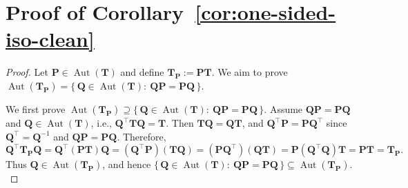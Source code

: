 \documentclass[onecolumn]{IEEEtran} %
\newcommand{\1}{\mathbbm{1}}
\DeclareMathOperator{\Aut}{Aut}
\theoremstyle{boldremark}
\begin{document}
\section{Proof of Corollary~\ref{cor:one-sided-iso-clean}}
\label{APP_proof_cor:one-sided-iso-clean}

\begin{proof}
Let $\mathbf P\in\Aut(\mathbf T)$ and define $\mathbf T_{\mathbf P}:=\mathbf P\mathbf T$.
We aim to prove $\Aut(\mathbf T_{\mathbf P})
=\bigl\{\,\mathbf Q\in\Aut(\mathbf T):\ \mathbf Q\mathbf P=\mathbf P\mathbf Q\,\bigr\}.$

We first prove
\(
\Aut(\mathbf{T}_{\mathbf{P}})
\supseteq
\bigl\{\,\mathbf{Q}\in\Aut(\mathbf{T}):\ \mathbf{Q}\mathbf{P}
  = \mathbf{P}\mathbf{Q}\,\bigr\}.
\)
Assume \(\mathbf{Q}\mathbf{P}=\mathbf{P}\mathbf{Q}\) and \(\mathbf{Q}\in\Aut(\mathbf{T})\), i.e.,
\(\mathbf{Q}^{\top}\mathbf{T}\mathbf{Q}=\mathbf{T}\).
Then \(\mathbf{T}\mathbf{Q}=\mathbf{Q}\mathbf{T}\), and
\(\mathbf{Q}^{\top}\mathbf{P}=\mathbf{P}\mathbf{Q}^{\top}\) since
\(\mathbf{Q}^{\top}=\mathbf{Q}^{-1}\) and \(\mathbf Q\mathbf P=\mathbf P\mathbf Q\).
Therefore,
\[
  \mathbf{Q}^{\top}\mathbf{T}_{\mathbf{P}}\mathbf{Q}
  = \mathbf{Q}^{\top}(\mathbf{P}\mathbf{T})\mathbf{Q}
  = (\mathbf{Q}^{\top}\mathbf{P})(\mathbf{T}\mathbf{Q})
  = (\mathbf{P}\mathbf{Q}^{\top})(\mathbf{Q}\mathbf{T})
  = \mathbf{P}(\mathbf{Q}^{\top}\mathbf{Q})\mathbf{T}
  = \mathbf{P}\mathbf{T}
  = \mathbf{T}_{\mathbf{P}}.
\]
Thus \(\mathbf{Q}\in\Aut(\mathbf{T}_{\mathbf{P}})\), and hence
$\bigl\{\,\mathbf{Q}\in\Aut(\mathbf{T}):\ \mathbf{Q}\mathbf{P}  = \mathbf{P}\mathbf{Q}\,\bigr\}
\subseteq\Aut(\mathbf{T}_{\mathbf{P}}).$


\end{proof}
\end{document}

